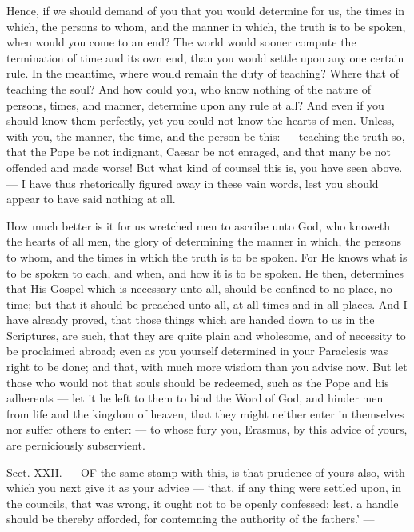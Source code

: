 Hence, if we should demand of you that you would determine for us, the times in which, the persons to whom, and the manner in which, the truth is to be spoken, when would you come to an end? The world would sooner compute the termination of time and its own end, than you would settle upon any one certain rule. In the meantime, where would remain the duty of teaching? Where that of teaching the soul? And how could you, who know nothing of the nature of persons, times, and manner, determine upon any rule at all? And even if you should know them perfectly, yet you could not know the hearts of men. Unless, with you, the manner, the time, and the person be this: — teaching the truth so, that the Pope be not indignant, Caesar be not enraged, and that many be not offended and made worse! But what kind of counsel this is, you have seen above. — I have thus rhetorically figured away in these vain words, lest you should appear to have said nothing at all.

How much better is it for us wretched men to ascribe unto God, who knoweth the hearts of all men, the glory of determining the manner in which, the persons to whom, and the times in which the truth is to be spoken. For He knows what is to be spoken to each, and when, and how it is to be spoken. He then, determines that His Gospel which is necessary unto all, should be confined to no place, no time; but that it should be preached unto all, at all times and in all places. And I have already proved, that those things which are handed down to us in the Scriptures, are such, that they are quite plain and wholesome, and of necessity to be proclaimed abroad; even as you yourself determined in your Paraclesis was right to be done; and that, with much more wisdom than you advise now. But let those who would not that souls should be redeemed, such as the Pope and his adherents — let it be left to them to bind the Word of God, and hinder men from life and the kingdom of heaven, that they might neither enter in themselves nor suffer others to enter: — to whose fury you, Erasmus, by this advice of yours, are perniciously subservient.


Sect. XXII. — OF the same stamp with this, is that prudence of yours also, with which you next give it as your advice — ‘that, if any thing were settled upon, in the councils, that was wrong, it ought not to be openly confessed: lest, a handle should be thereby afforded, for contemning the authority of the fathers.’ —

